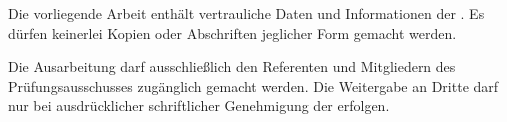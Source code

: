 Die vorliegende Arbeit enthält vertrauliche Daten und Informationen der \firma.
Es dürfen keinerlei Kopien oder Abschriften jeglicher Form gemacht werden.

Die Ausarbeitung darf ausschließlich den Referenten und Mitgliedern des Prüfungsausschusses zugänglich gemacht werden.
Die Weitergabe an Dritte darf nur bei ausdrücklicher schriftlicher Genehmigung der \firma \space erfolgen.
